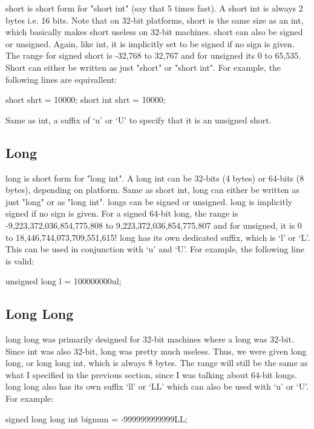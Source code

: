 \documentclass{article}
\begin{document}
short is short form for "short int" (say that 5 times fast). A short int is always 2 bytes i.e. 16 bits. Note
that on 32-bit platforms, short is the same size as an int, which basically makes short useless on 32-bit
machines. short can also be signed or unsigned. Again, like int, it is implicitly set to be signed if no sign
is given. The range for signed short is -32,768 to 32,767 and for unsigned its 0 to 65,535. Short can either
be written as just "short" or "short int". For example, the following lines are equivallent:

\begin{clst}
short shrt = 10000;
short int shrt = 10000;
\end{clst}

Same as int, a suffix of ‘u’ or ‘U’ to specify that it is an unsigned short.

\subsection{Long}

long is short form for "long int". A long int can be 32-bits (4 bytes) or 64-bits (8 bytes), depending on
platform. Same as short int, long can either be written as just "long" or as "long int". longs can be signed
or unsigned. long is implicitly signed if no sign is given. For a signed 64-bit long, the range is
-9,223,372,036,854,775,808 to 9,223,372,036,854,775,807 and for unsigned, it is 0 to 18,446,744,073,709,551,615!
long has its own dedicated suffix, which is ‘l’ or ‘L’. This can be used in conjunction with ‘u’ and ‘U’. For
example, the following line is valid:

\begin{clst}
unsigned long l = 100000000ul;
\end{clst}

\subsection{Long Long}

long long was primarily designed for 32-bit machines where a long was 32-bit. Since int was also 32-bit, long
was pretty much useless. Thus, we were given long long, or long long int, which is always 8 bytes. The range
will still be the same as what I specified in the previous section, since I was talking about 64-bit longs.
long long also has its own suffix ‘ll’ or ‘LL’ which can also be used with ‘u’ or ‘U’. For example:

\begin{clst}
signed long long int bignum = -999999999999LL;
\end{clst}
\end{document}
